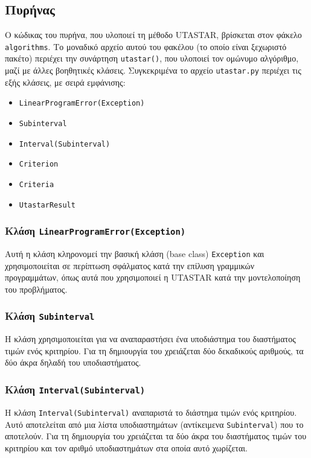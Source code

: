 \documentclass[11pt,a4paper,titlepage]{article}
\numberwithin{equation}{section}
\begin{document}
\subsection{Πυρήνας}
\label{ssec:impl-kernel}
Ο κώδικας του πυρήνα, που υλοποιεί τη μέθοδο UTASTAR, βρίσκεται στον φάκελο \texttt{algorithms}. Το μοναδικό αρχείο αυτού του φακέλου (το οποίο είναι ξεχωριστό πακέτο) περιέχει την συνάρτηση \texttt{utastar()}, που υλοποιεί τον ομώνυμο αλγόριθμο, μαζί με άλλες βοηθητικές κλάσεις. Συγκεκριμένα το αρχείο \texttt{utastar.py} περιέχει τις εξής κλάσεις, με σειρά εμφάνισης:

\begin{itemize}
    \item \texttt{LinearProgramError(Exception)}
    \item \texttt{Subinterval}
    \item \texttt{Interval(Subinterval)}
    \item \texttt{Criterion}
    \item \texttt{Criteria}
    \item \texttt{UtastarResult}
\end{itemize}

\subsubsection{Κλάση \texttt{LinearProgramError(Exception)}}
\label{sssec:LinearProgramError}
Αυτή η κλάση κληρονομεί την βασική κλάση (base class) \texttt{Exception} και χρησιμοποιείται σε περίπτωση σφάλματος κατά την επίλυση γραμμικών προγραμμάτων, όπως αυτά που χρησιμοποιεί η UTASTAR κατά την μοντελοποίηση του προβλήματος.

\subsubsection{Κλάση \texttt{Subinterval}}
\label{sssec:Subinterval}
Η κλάση χρησιμοποιείται για να αναπαραστήσει ένα υποδιάστημα του διαστήματος τιμών ενός κριτηρίου. Για τη δημιουργία του χρειάζεται δύο δεκαδικούς αριθμούς, τα δύο άκρα δηλαδή του υποδιαστήματος.

\subsubsection{Κλάση \texttt{Ιnterval(Subinterval)}}
\label{sssec:Ιnterval}
Η κλάση \texttt{Ιnterval(Subinterval)} αναπαριστά το διάστημα τιμών ενός κριτηρίου. Αυτό αποτελείται από μια λίστα υποδιαστημάτων (αντίκειμενα \texttt{Subinterval}) που το αποτελούν. Για τη δημιουργία του χρειάζεται τα δύο άκρα του διαστήματος τιμών του κριτηρίου και τον αριθμό υποδιαστημάτων στα οποία αυτό χωρίζεται.
\end{document}
